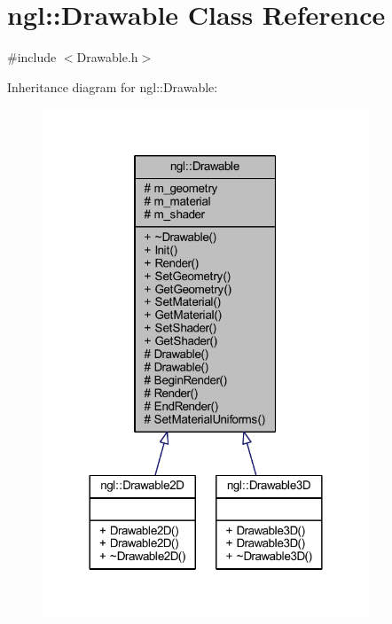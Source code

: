 \hypertarget{classngl_1_1_drawable}{}\section{ngl\+:\+:Drawable Class Reference}
\label{classngl_1_1_drawable}


{\ttfamily \#include $<$Drawable.\+h$>$}



Inheritance diagram for ngl\+:\+:Drawable\+:
\nopagebreak
\begin{figure}[H]
\begin{center}
\leavevmode
\includegraphics[width=276pt]{classngl_1_1_drawable__inherit__graph}
\end{center}
\end{figure}


